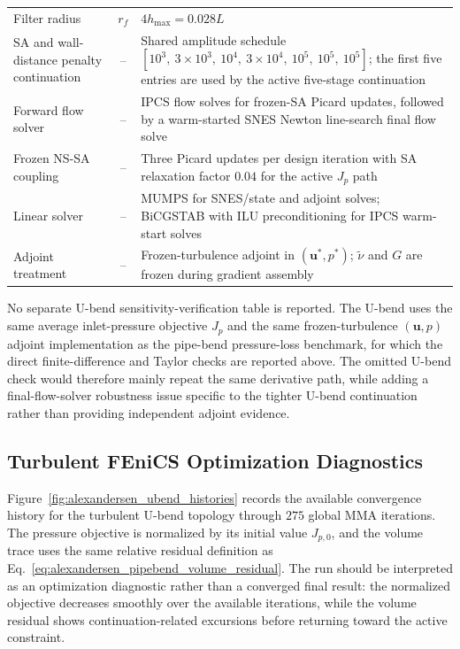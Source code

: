 \begin{table}[htbp]
\begin{tabularx}{\textwidth}{l c X}
			Filter radius & $r_f$ & $4h_{\max}=0.028L$ \\
			SA and wall-distance penalty continuation & -- & Shared amplitude schedule $[10^3,\ 3\times10^3,\ 10^4,\ 3\times10^4,\ 10^5,\ 10^5,\ 10^5]$; the first five entries are used by the active five-stage continuation \\
			Forward flow solver & -- & IPCS flow solves for frozen-SA Picard updates, followed by a warm-started SNES Newton line-search final flow solve \\
				Frozen NS-SA coupling & -- & Three Picard updates per design iteration with SA relaxation factor $0.04$ for the active $J_p$ path \\
			Linear solver & -- & MUMPS for SNES/state and adjoint solves; BiCGSTAB with ILU preconditioning for IPCS warm-start solves \\
		Adjoint treatment & -- & Frozen-turbulence adjoint in $(\mathbf{u}^*,p^*)$; $\tilde{\nu}$ and $G$ are frozen during gradient assembly \\
		\hline
	\end{tabularx}
\end{table}

No separate U-bend sensitivity-verification table is reported. The U-bend uses the same average inlet-pressure objective $J_p$ and the same frozen-turbulence $(\mathbf{u},p)$ adjoint implementation as the pipe-bend pressure-loss benchmark, for which the direct finite-difference and Taylor checks are reported above. The omitted U-bend check would therefore mainly repeat the same derivative path, while adding a final-flow-solver robustness issue specific to the tighter U-bend continuation rather than providing independent adjoint evidence.

\subsection{Turbulent FEniCS Optimization Diagnostics}
\label{subsec:app_B_alexandersen_ubend_turb_diagnostics}
Figure~\ref{fig:alexandersen_ubend_histories} records the available convergence history for the turbulent U-bend topology through $275$ global MMA iterations. The pressure objective is normalized by its initial value $J_{p,0}$, and the volume trace uses the same relative residual definition as Eq.~\eqref{eq:alexandersen_pipebend_volume_residual}. The run should be interpreted as an optimization diagnostic rather than a converged final result: the normalized objective decreases smoothly over the available iterations, while the volume residual shows continuation-related excursions before returning toward the active constraint.

